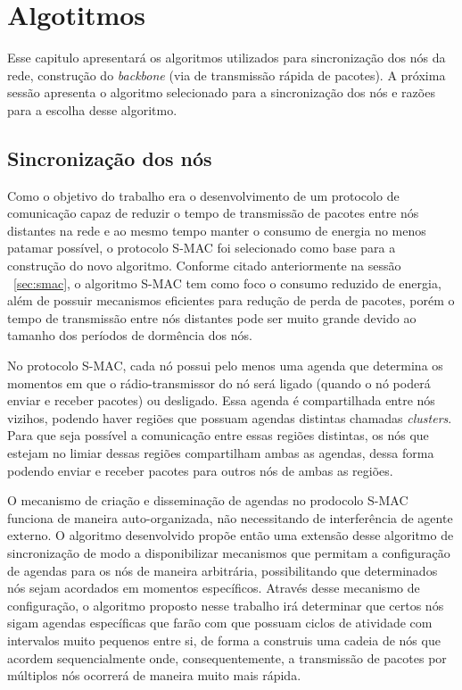 \section{Algotitmos}

Esse capitulo apresentará os algoritmos utilizados para sincronização dos nós da rede, construção do \emph{backbone} (via de transmissão rápida de pacotes). 
A próxima sessão apresenta o algoritmo selecionado para a sincronização dos nós e razões para a escolha desse algoritmo.

\subsection{Sincronização dos nós}

Como o objetivo do trabalho era o desenvolvimento de um protocolo de comunicação capaz de reduzir o tempo de transmissão de pacotes entre nós distantes na rede e ao mesmo tempo manter o consumo de energia no menos patamar possível, o protocolo S-MAC\cite{ye04} foi selecionado como base para a construção do novo algoritmo. Conforme citado anteriormente na sessão ~\ref{sec:smac}, o algoritmo S-MAC tem como foco o consumo reduzido de energia, além de possuir mecanismos eficientes para redução de perda de pacotes, porém o tempo de transmissão entre nós distantes pode ser muito grande devido ao tamanho dos períodos de dormência dos nós.

No protocolo S-MAC\cite{ye04}, cada nó possui pelo menos uma agenda que determina os momentos em que o rádio-transmissor do nó será ligado (quando o nó poderá enviar e receber pacotes) ou desligado. Essa agenda é compartilhada entre nós vizihos, podendo haver regiões que possuam agendas distintas chamadas \emph{clusters}. Para que seja possível a comunicação entre essas regiões distintas, os nós que estejam no limiar dessas regiões compartilham ambas as agendas, dessa forma podendo enviar e receber pacotes para outros nós de ambas as regiões.

O mecanismo de criação e disseminação de agendas no prodocolo S-MAC funciona de maneira auto-organizada, não necessitando de interferência de agente externo. O algoritmo desenvolvido propõe então uma extensão desse algoritmo de sincronização de modo a disponibilizar mecanismos que permitam a configuração de agendas para os nós de maneira arbitrária, possibilitando que determinados nós sejam acordados em momentos específicos. Através desse mecanismo de configuração, o algoritmo proposto nesse trabalho irá determinar que certos nós sigam agendas específicas que farão com que possuam ciclos de atividade com intervalos muito pequenos entre si, de forma a construis uma cadeia de nós que acordem sequencialmente onde, consequentemente, a transmissão de pacotes por múltiplos nós ocorrerá de maneira muito mais rápida.

